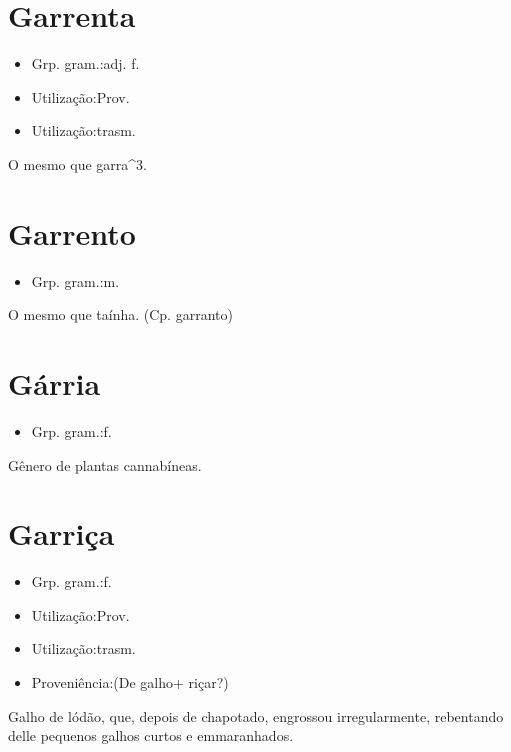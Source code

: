 \section{Garrenta}
\begin{itemize}
\item {Grp. gram.:adj. f.}
\end{itemize}
\begin{itemize}
\item {Utilização:Prov.}
\end{itemize}
\begin{itemize}
\item {Utilização:trasm.}
\end{itemize}
O mesmo que \textunderscore garra\textunderscore ^3.
\section{Garrento}
\begin{itemize}
\item {Grp. gram.:m.}
\end{itemize}
O mesmo que \textunderscore taínha\textunderscore .
(Cp. \textunderscore garranto\textunderscore )
\section{Gárria}
\begin{itemize}
\item {Grp. gram.:f.}
\end{itemize}
Gênero de plantas cannabíneas.
\section{Garriça}
\begin{itemize}
\item {Grp. gram.:f.}
\end{itemize}
\begin{itemize}
\item {Utilização:Prov.}
\end{itemize}
\begin{itemize}
\item {Utilização:trasm.}
\end{itemize}
\begin{itemize}
\item {Proveniência:(De \textunderscore galho\textunderscore  + \textunderscore riçar\textunderscore ?)}
\end{itemize}
Galho de lódão, que, depois de chapotado, engrossou irregularmente, rebentando delle pequenos galhos curtos e emmaranhados.
